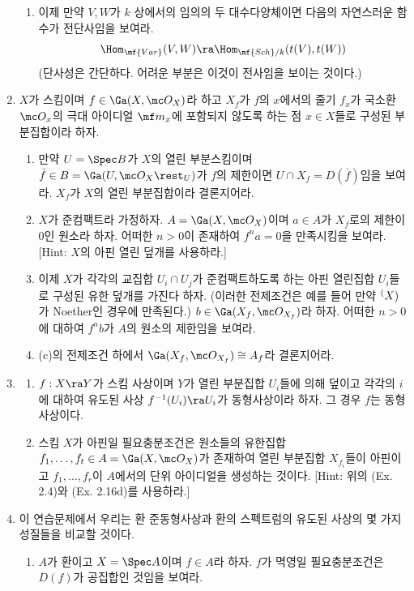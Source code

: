 \begin{enumerate}[label=\tb{2.\arabic*.},itemindent=0mm,itemsep=2mm]
\begin{enumerate}[label=(\alph*)]
	\item 이제 만약 $V,W$가 $k$ 상에서의 임의의 두 대수다양체이면 다음의 자연스러운 함수가 전단사임을 보여라.
	$$\Hom_{\mf{Var}}(V,W)\ra\Hom_{\mf{Sch}/k}(t(V),t(W))$$
	(단사성은 간단하다. 어려운 부분은 이것이 전사임을 보이는 것이다.)
	\end{enumerate}
	\item $X$가 스킴이며 $f\in\Ga(X,\mc O_X)$라 하고 $X_f$가 $f$의 $x$에서의 줄기 $f_x$가
	국소환 $\mc O_x$의 극대 아이디얼 $\mf m_x$에 포함되지 않도록 하는 점 $x\in X$들로 구성된 부분집합이라 하자.
	\begin{enumerate}[label=(\alph*)]
	\item 만약 $U=\Spec B$가 $X$의 열린  부분스킴이며 $\bar f\in B=\Ga(U,\mc O_X\rest_U)$가 $f$의 제한이면
	$U\cap X_f=D(\bar f)$임을 보여라. $X_f$가 $X$의 열린 부분집합이라 결론지어라.
	\item $X$가 준컴팩트라 가정하자. $A=\Ga(X,\mc O_X)$이며 $a\in A$가 $X_f$로의 제한이 0인 원소라 하자.
	어떠한 $n>0$이 존재하여 $f^na=0$을 만족시킴을 보여라. [Hint: $X$의 아핀 열린 덮개를 사용하라.]
	\item 이제 $X$가 각각의 교집합 $U_i\cap U_j$가 준컴팩트하도록 하는 아핀 열린집합 $U_i$들로 구성된 유한 덮개를 가진다 하자.
	(이러한 전제조건은 예를 들어 만약 $\sp(X)$가 Noether인 경우에 만족된다.)
	$b\in\Ga(X_f,\mc O_{X_f})$라 하자. 어떠한 $n>0$에 대하여 $f^nb$가 $A$의 원소의 제한임을 보여라.
	\item (c)의 전제조건 하에서 $\Ga(X_f,\mc O_{X_f})\cong A_f$라 결론지어라.
	\end{enumerate}
	\item {}
	\begin{enumerate}[label=(\alph*)]
	\item $f:X\ra Y$가 스킴 사상이며 $Y$가 열린 부분집합 $U_i$들에 의해 덮이고
	각각의 $i$에 대하여 유도된 사상 $f^{-1}(U_i)\ra U_i$가 동형사상이라 하자. 그 경우 $f$는 동형사상이다.
	\item 스킴 $X$가 아핀일 필요충분조건은 원소들의 유한집합 $f_1,\ldots,f_t\in A=\Ga(X,\mc O_X)$가 존재하여
	열린 부분집합 $X_{f_i}$들이 아핀이고 $f_1,\ldots,f_r$이 $A$에서의 단위 아이디얼을 생성하는 것이다.
	[Hint: 위의 (Ex. 2.4)와 (Ex. 2.16d)를 사용하라.]
	\end{enumerate}
	\item 이 연습문제에서 우리는 환 준동형사상과 환의 스펙트럼의 유도된 사상의 몇 가지 성질들을 비교할 것이다.
	\begin{enumerate}[label=(\alph*)]
	\item $A$가 환이고 $X=\Spec A$이며 $f\in A$라 하자. $f$가 멱영일 필요충분조건은 $D(f)$가 공집합인 것임을 보여라.

\end{enumerate}
\end{enumerate}
